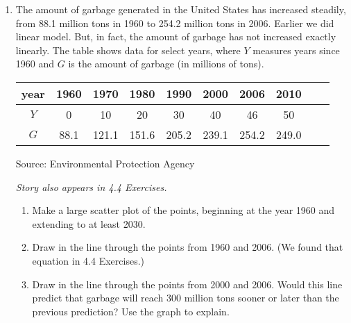 \begin{enumerate}
\item The amount of garbage generated in the United States has increased steadily, from 88.1 million tons in 1960 to 254.2 million tons in 2006. Earlier we did linear model. 
But, in fact, the amount of garbage has not increased exactly linearly.  The table shows data for select years, where $Y$ measures years since 1960 and $G$ is the amount of garbage (in millions of tons).
\begin{center}
\begin{tabular} {|c||c|c |c|c|c|c|c|c|c|}  \hline
year & 1960 & 1970 & 1980 & 1990 & 2000 & 2006 & 2010 \\ \hline
$Y$ & 0 & 10 & 20 & 30 & 40 & 46 & 50 \\ \hline
$G$ & 88.1 & 121.1 & 151.6 & 205.2 & 239.1 & 254.2 & 249.0 \\ \hline
\end{tabular}
\end{center}
\hfill \begin{footnotesize} Source:  Environmental Protection Agency \end{footnotesize}

\hfill \emph{Story also appears in 4.4 Exercises.}

\begin{enumerate}
\item Make a large scatter plot of the points, beginning at the year 1960 and extending to at least 2030.  
\item Draw in the line through the points from 1960 and 2006.  (We found that equation in 4.4 Exercises.)  
\item Draw in the line through the points from 2000 and 2006.  Would this line predict that garbage will reach 300 million tons sooner or later than the previous prediction?  Use the graph to explain. 
\end{enumerate}  


\end{enumerate}
